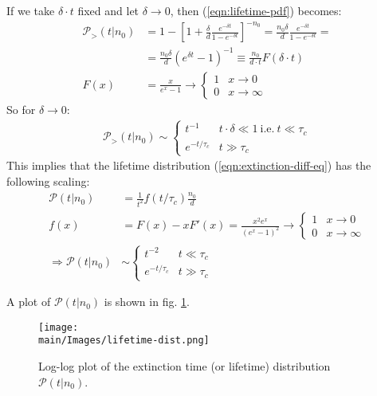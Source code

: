 \documentclass[../../main.tex]{subfiles}
\begin{document}
\medskip

If we take $\delta \cdot t$ fixed and let $\delta \to 0$, then (\ref{eqn:lifetime-pdf}) becomes:
\begin{align*}
    \mathcal{P}_>(t|n_0) &= 1-\left[1+\frac{\delta}{d} \frac{e^{-\delta t}}{1 - e^{-\delta t}}  \right]^{-n_0} = \frac{n_0 \delta}{d} \frac{e^{-\delta t}}{1 - e^{-\delta t}} =\\
    &= \frac{n_0 \delta}{d} (e^{\delta t} - 1)^{-1} \equiv \frac{n_0}{d \cdot t} F(\delta \cdot t)  \\
    F(x) &= \frac{x}{e^x -1} \to \begin{cases}
        1 & x \to 0\\
        0 & x \to \infty
    \end{cases}
\end{align*}
So for $\delta \to 0$:
\begin{align*}
    \mathcal{P}_>(t|n_0) \sim \begin{cases}
        t^{-1} & t \cdot \delta \ll 1 \mathrm{\ i.e.\ } t \ll \tau_c\\
        e^{-t/\tau_c} & t \gg \tau_c
    \end{cases}
\end{align*}
This implies that the lifetime distribution (\ref{eqn:extinction-diff-eq}) has the following scaling:
\begin{align}\label{eqn:lifetime-dist}
    \mathcal{P}(t|n_0) &= \frac{1}{t^2} f(t/\tau_c) \frac{n_0}{d}\\ \nonumber
    f(x) &= F(x) - xF'(x) = \frac{x^2 e^x}{(e^x - 1)^2} \to \begin{cases}
        1 & x \to 0\\
        0 & x \to \infty
    \end{cases} \\ \nonumber
    \Rightarrow \mathcal{P}(t|n_0) &\sim \begin{cases}
        t^{-2} & t \ll \tau_c\\
        e^{-t/\tau_c} & t \gg \tau_c
    \end{cases}
\end{align}

A plot of $\mathcal{P}(t|n_0)$ is shown in fig. \ref{fig:lifetime-dist}.

\begin{figure}[H]
    \centering
    \texttt{[image: \\main/Images/lifetime-dist.png]}
    \caption{Log-log plot of the extinction time (or lifetime) distribution $\mathcal{P}(t|n_0)$.}
    \label{fig:lifetime-dist}
\end{figure}
\end{document}
